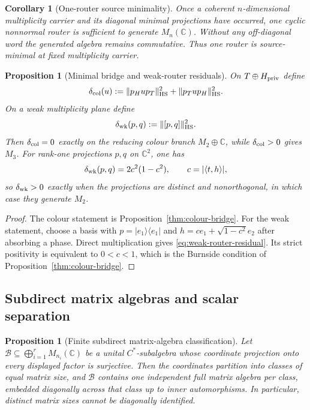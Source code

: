 \documentclass[11pt]{article}
\numberwithin{equation}{section}
\newtheorem{proposition}[theorem]{Proposition}
\newtheorem{corollary}[theorem]{Corollary}
\theoremstyle{definition}
\theoremstyle{remark}
\newcommand{\C}{\mathbb C}
\newcommand{\HS}{\mathrm{HS}}
\newcommand{\norm}[1]{\lVert#1\rVert}
\newcommand{\abs}[1]{\lvert#1\rvert}
\begin{document}
\begin{corollary}[One-router source minimality]
\label{cor:one-router-minimality}
Once a coherent $n$-dimensional multiplicity carrier and its diagonal minimal
projections have occurred, one cyclic nonnormal router is sufficient to
generate $M_n(\C)$.  Without any off-diagonal word the generated algebra
remains commutative.  Thus one router is source-minimal at fixed multiplicity
carrier.
\end{corollary}

\begin{proposition}[Minimal bridge and weak-router residuals]
\label{prop:bridge-router-residuals}
On $T\oplus H_{\rm priv}$ define
\[
\delta_{\rm col}(u)
:=
\norm{p_Hup_T}_{\HS}^2+\norm{p_Tup_H}_{\HS}^2.
\]
On a weak multiplicity plane define
\[
\delta_{\rm wk}(p,q):=\norm{[p,q]}_{\HS}^2.
\]
Then $\delta_{\rm col}=0$ exactly on the reducing colour branch
$M_2\oplus\C$, while $\delta_{\rm col}>0$ gives $M_3$.  For rank-one
projections $p,q$ on $\C^2$, one has
\begin{equation}
\delta_{\rm wk}(p,q)
=2c^2(1-c^2),
\qquad c=\abs{\langle t,h\rangle},
\label{eq:weak-router-residual}
\end{equation}
so $\delta_{\rm wk}>0$ exactly when the projections are distinct and
nonorthogonal, in which case they generate $M_2$.
\end{proposition}

\begin{proof}
The colour statement is Proposition~\ref{thm:colour-bridge}.  For the weak
statement, choose a basis with $p=|e_1\rangle\langle e_1|$ and
$h=ce_1+\sqrt{1-c^2}e_2$ after absorbing a phase.  Direct multiplication gives
\eqref{eq:weak-router-residual}.  Its strict positivity is equivalent to
$0<c<1$, which is the Burnside condition of Proposition~\ref{thm:colour-bridge}.
\end{proof}


\subsection{Subdirect matrix algebras and scalar separation}

\begin{proposition}[Finite subdirect matrix-algebra classification]
\label{thm:subdirect-classification}
Let $\mathcal B\subseteq\bigoplus_{i=1}^rM_{n_i}(\C)$ be a unital
$C^*$-subalgebra whose coordinate projection onto every displayed factor is
surjective.  Then the coordinates partition into classes of equal matrix size,
and $\mathcal B$ contains one independent full matrix algebra per class,
embedded diagonally across that class up to inner automorphisms.  In
particular, distinct matrix sizes cannot be diagonally identified.
\end{proposition}
\end{document}
